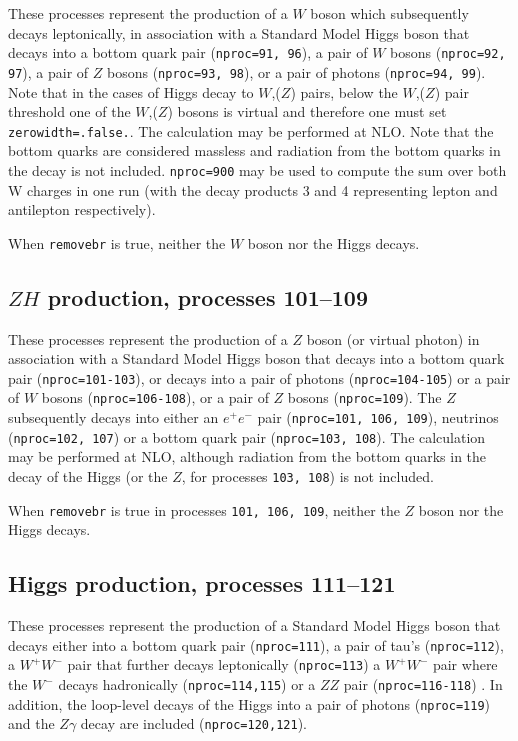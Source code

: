 These processes represent the production of a $W$ boson which subsequently
decays leptonically, in association with a Standard Model Higgs boson that
decays into a bottom quark pair ({\tt nproc=91, 96}), 
a pair of $W$ bosons ({\tt nproc=92, 97}), 
a pair of $Z$ bosons ({\tt nproc=93, 98}), or a pair of photons ({\tt nproc=94, 99}).  
Note that in the cases of Higgs decay to $W$,($Z$) pairs, 
below the $W$,($Z$) pair threshold
one of the $W$,($Z$) bosons is virtual 
and therefore one must set {\tt zerowidth=.false.}.
The calculation may be performed at NLO.
Note that the bottom quarks are considered massless and radiation from the
bottom quarks in the decay is not included.
\texttt{nproc=900} may be used to compute the sum over both W charges in
one run (with the decay products 3 and 4 representing lepton and antilepton
respectively).

When {\tt removebr} is true, neither the $W$ boson nor the Higgs decays.

\subsection{$ZH$ production, processes 101--109}
\label{subsec:zh}

These processes represent the production of a $Z$ boson (or virtual photon)
in association with a Standard Model Higgs boson that
decays into a bottom quark pair ({\tt nproc=101-103}),
or decays into a pair of photons ({\tt nproc=104-105}) 
or a pair of $W$ bosons ({\tt nproc=106-108}),
or a pair of $Z$ bosons ({\tt nproc=109}). 
The $Z$ subsequently decays into 
either an $e^+ e^-$ pair ({\tt nproc=101, 106, 109}), neutrinos ({\tt nproc=102, 107})
or a bottom quark pair ({\tt nproc=103, 108}).
The calculation may be performed at NLO, although radiation from the
bottom quarks in the decay of the Higgs (or the $Z$, for processes
{\tt 103, 108}) is not included.

When {\tt removebr} is true in processes {\tt 101, 106, 109}, neither the $Z$ boson
nor the Higgs decays.

\subsection{Higgs production, processes 111--121}
\label{subsec:h}

These processes represent the production of a Standard Model Higgs
boson that decays either into a bottom quark
pair ({\tt nproc=111}), a pair of tau's ({\tt nproc=112}), 
a $W^+W^-$ 
pair that further decays leptonically ({\tt nproc=113}) 
a $W^+W^-$ pair where the $W^-$ decays hadronically ({\tt nproc=114,115}) 
or a $ZZ$ pair ({\tt nproc=116-118}) . In addition, the loop-level decays of the Higgs 
into a pair of photons ({\tt nproc=119}) and the $Z\gamma$ decay are included
({\tt nproc=120,121}).

